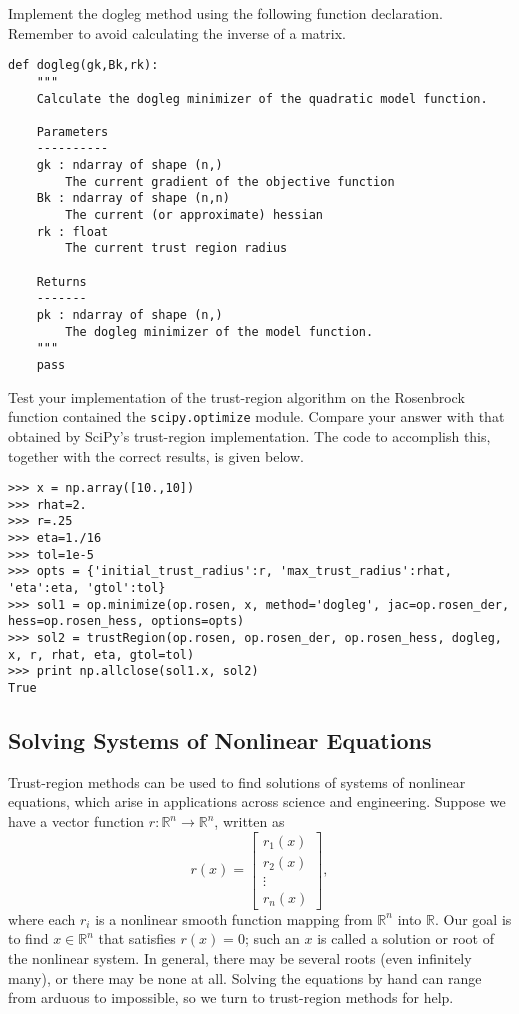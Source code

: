 \begin{problem}
Implement the dogleg method using the following function declaration.
Remember to avoid calculating the inverse of a matrix.
\begin{lstlisting}
def dogleg(gk,Bk,rk):
    """
    Calculate the dogleg minimizer of the quadratic model function.

    Parameters
    ----------
    gk : ndarray of shape (n,)
        The current gradient of the objective function
    Bk : ndarray of shape (n,n)
        The current (or approximate) hessian
    rk : float
        The current trust region radius

    Returns
    -------
    pk : ndarray of shape (n,)
        The dogleg minimizer of the model function.
    """
    pass
\end{lstlisting}


\end{problem}

Test your implementation of the trust-region algorithm on the Rosenbrock function contained the {\tt scipy.optimize} module.
Compare your answer with that obtained by SciPy's trust-region implementation. The code to accomplish this, together with the
correct results, is given below.
\begin{lstlisting}
>>> x = np.array([10.,10])
>>> rhat=2.
>>> r=.25
>>> eta=1./16
>>> tol=1e-5
>>> opts = {'initial_trust_radius':r, 'max_trust_radius':rhat, 'eta':eta, 'gtol':tol}
>>> sol1 = op.minimize(op.rosen, x, method='dogleg', jac=op.rosen_der, hess=op.rosen_hess, options=opts)
>>> sol2 = trustRegion(op.rosen, op.rosen_der, op.rosen_hess, dogleg, x, r, rhat, eta, gtol=tol)
>>> print np.allclose(sol1.x, sol2)
True
\end{lstlisting}

\subsection*{Solving Systems of Nonlinear Equations}
Trust-region methods can be used to find solutions of systems of nonlinear equations, which arise in applications across science and engineering.
Suppose we have a vector function $r : \mathbb{R}^n \rightarrow \mathbb{R}^n$, written as
\[
r(x) = \begin{bmatrix}
r_1(x)\\
r_2(x)\\
\vdots\\
r_n(x)
\end{bmatrix},
\]
where each $r_i$ is a nonlinear smooth function mapping from $\mathbb{R}^n$ into $\mathbb{R}$.
Our goal is to find $x \in \mathbb{R}^n$ that satisfies $r(x) = 0$; such an $x$ is called a solution
or root of the nonlinear system. In general, there may be several roots (even infinitely many), or there
may be none at all. Solving the equations by hand can range from arduous to impossible, so we turn
to trust-region methods for help.

